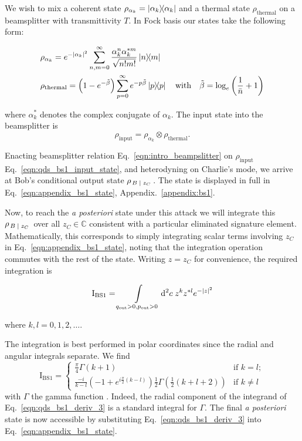We wish to mix a coherent state $\rho_{\alpha_k} = \dyad{\alpha_k}$ and a thermal state $\rho_{\text{thermal}}$ on a beamsplitter with transmittivity $T$. In Fock basis our states take the following form:

\begin{align}
&\rho_{\alpha_k} = e^{-\left|\alpha_k\right|^2} \sum_{n, m=0}^{\infty} \frac{\alpha_k^n \alpha_k^{* m}}{\sqrt{n! m!}} \dyad{n}{m} \notag \\
&\rho_{\text{thermal}} = \left(1 - e^{-\tilde{\beta}}\right) \sum_{p=0}^\infty e^{- p \tilde{\beta}}\dyad{p} \qq{with} \tilde{\beta} = \log_e\left(\frac{1}{\bar{n}} +1\right)
\end{align}

\noindent where $\alpha_k^{*}$ denotes the complex conjugate of $\alpha_k$. The input state into the beamsplitter is
\begin{equation}\label{eqn:qds_bs1_input_state}
\rho_{\text{input}} = \rho_{\alpha_k} \otimes \rho_{\text{thermal}}.
\end{equation}

\noindent Enacting beamsplitter relation Eq.~\ref{eqn:intro_beampslitter} on $\rho_{\text{input}}$ Eq.~\ref{eqn:qds_bs1_input_state}, and heterodyning on Charlie's mode, we arrive at Bob's conditional output state $\rho_{\left. B \; \middle| \; z_C \right.}$. The state is displayed in full in Eq.~\ref{eqn:appendix_bs1_state}, Appendix.~\ref{appendix:bs1}.



Now, to reach the \emph{a posteriori} state under this attack we will integrate this $\rho_{\left. B \; \middle| \; z_C \right.}$ over all $z_C \in \mathbb{C}$ consistent with a particular eliminated signature element. Mathematically, this corresponds to simply integrating scalar terms involving $z_C$ in Eq.~\ref{eqn:appendix_bs1_state}, noting that the integration operation commutes with the rest of the state. Writing $z = z_C$ for convenience, the required integration is

\begin{equation}
\text{I}_{\text{BS}1} = \int\limits_{q_{\text{out}}>0, p_{\text{out}}>0} \mathop{}\!\mathrm{d^2} c \; z^k z^{* l} e^{ - \left| z \right|^2}
\end{equation}

\noindent where $k, l = 0, 1, 2, \dots$.

The integration is best performed in polar coordinates since the radial and angular integrals separate. We find
\begin{equation}\label{eqn:qds_bs1_deriv_3}
\text{I}_{\text{BS}1} =
\begin{cases}
\frac{\pi}{4} \Gamma\left(k+1\right) & \text{if } k = l; \\
\frac{-i}{k-l}\left(-1 + e^{i \frac{\pi}{2}\left(k-l\right)}\right)\frac{1}{2}\Gamma\left(\frac{1}{2}\left(k + l + 2\right) \right) & \text{if } k \ne l
\end{cases}
\end{equation}
with $\Gamma$ the gamma function \cite{mathworld_gamma}. Indeed, the radial component of the integrand of Eq.~\ref{eqn:qds_bs1_deriv_3} is a standard integral for $\Gamma$. The final \emph{a posteriori} state is now accessible by substituting Eq.~\ref{eqn:qds_bs1_deriv_3} into Eq.~\ref{eqn:appendix_bs1_state}.

